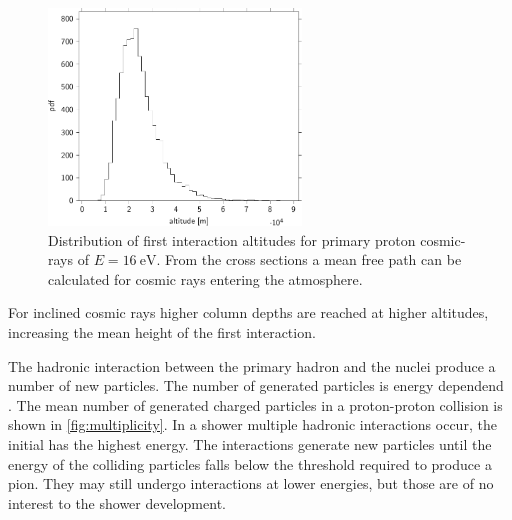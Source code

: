 \begin{figure}
    \centering
    \includegraphics[width=0.6\textwidth]
                    {plots/cosmic-rays/first_interaction_altitude}
    \caption{Distribution of first interaction altitudes for primary proton cosmic-rays of $E = \SI{16}{\eV}$. From the cross sections a mean free path can be calculated for cosmic rays entering the atmosphere. \cite{heck2013corsika}}
    \label{fig:first_interaction_altitude}
\end{figure}

For inclined cosmic rays higher column depths are reached at higher altitudes, increasing the mean height of the first interaction.


The hadronic interaction between the primary hadron and the nuclei produce a number of new particles. The number of generated particles is energy dependend \cite{grieder2010eas}. The mean number of generated charged particles in a proton-proton collision is shown in \cref{fig:multiplicity}. In a shower multiple hadronic interactions occur, the initial has the highest energy. The interactions generate new particles until the energy of the colliding particles falls below the threshold required to produce a pion. They may still undergo interactions at lower energies, but those are of no interest to the shower development.

